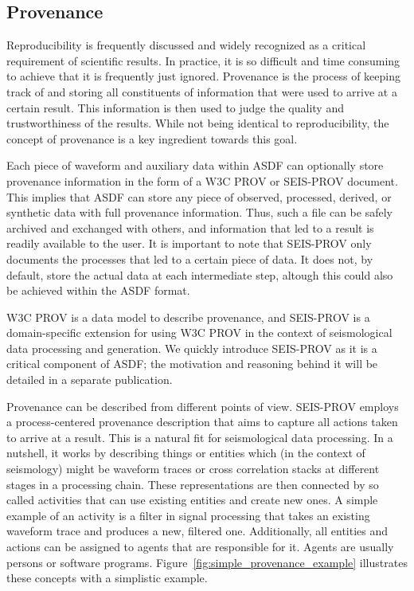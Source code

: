 \subsection{Provenance}

Reproducibility is frequently discussed and widely recognized as a critical
requirement of scientific results. In practice, it is so difficult and time
consuming to achieve that it is frequently just ignored.  Provenance is the
process of keeping track of and storing all constituents of information that
were used to arrive at a certain result. This
information is then used to judge the quality and trustworthiness of the
results.  While not being identical to reproducibility, the concept of
provenance is a key ingredient towards this goal.

Each piece of waveform and auxiliary data within ASDF can optionally store
provenance information in the form of a W3C PROV or SEIS-PROV document. This implies that ASDF can store any piece of observed, processed,
derived, or synthetic data with full provenance information. Thus, such a file
can be safely archived and exchanged with others, and information that led to a result is readily available to the user. It is important to note that
SEIS-PROV only documents the processes that led to a certain piece of data. It
does not, by default, store the actual data at each intermediate step, altough
this could also be achieved within the ASDF format.

W3C PROV is a data model to describe provenance, and SEIS-PROV is a
domain-specific extension for using W3C PROV in the context of seismological
data processing and generation. We quickly introduce SEIS-PROV as it is a
critical component of ASDF; the motivation and reasoning behind it will be
detailed in a separate publication.

Provenance can be described from different points of view. SEIS-PROV employs a
process-centered provenance description that aims to capture all actions taken
to arrive at a result. This is a natural fit for seismological
data processing. In a nutshell, it works by describing things or entities which
(in the context of seismology) might be waveform traces or cross correlation
stacks at different stages in a processing chain. These representations are
then connected by so called activities that can use existing entities and
create new ones. A simple example of an activity is a filter in signal
processing that takes an existing waveform trace and produces a new, filtered
one.  Additionally, all entities and actions can be assigned to agents that are
responsible for it.  Agents are usually persons or software programs.
Figure~\ref{fig:simple_provenance_example} illustrates these concepts with a
simplistic example.

